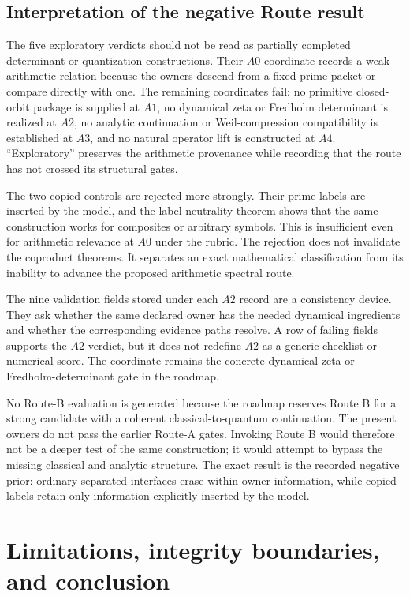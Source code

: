 \documentclass[11pt]{article}
\theoremstyle{definition}
\begin{document}
\subsection{Interpretation of the negative Route result}

The five exploratory verdicts should not be read as partially completed determinant or quantization constructions.  Their $A0$ coordinate records a weak arithmetic relation because the owners descend from a fixed prime packet or compare directly with one.  The remaining coordinates fail: no primitive closed-orbit package is supplied at $A1$, no dynamical zeta or Fredholm determinant is realized at $A2$, no analytic continuation or Weil-compression compatibility is established at $A3$, and no natural operator lift is constructed at $A4$.  ``Exploratory'' preserves the arithmetic provenance while recording that the route has not crossed its structural gates.

The two copied controls are rejected more strongly.  Their prime labels are inserted by the model, and the label-neutrality theorem shows that the same construction works for composites or arbitrary symbols.  This is insufficient even for arithmetic relevance at $A0$ under the rubric.  The rejection does not invalidate the coproduct theorems.  It separates an exact mathematical classification from its inability to advance the proposed arithmetic spectral route.

The nine validation fields stored under each $A2$ record are a consistency device.  They ask whether the same declared owner has the needed dynamical ingredients and whether the corresponding evidence paths resolve.  A row of failing fields supports the $A2$ verdict, but it does not redefine $A2$ as a generic checklist or numerical score.  The coordinate remains the concrete dynamical-zeta or Fredholm-determinant gate in the roadmap.

No Route-B evaluation is generated because the roadmap reserves Route B for a strong candidate with a coherent classical-to-quantum continuation.  The present owners do not pass the earlier Route-A gates.  Invoking Route B would therefore not be a deeper test of the same construction; it would attempt to bypass the missing classical and analytic structure.  The exact result is the recorded negative prior: ordinary separated interfaces erase within-owner information, while copied labels retain only information explicitly inserted by the model.

\section{Limitations, integrity boundaries, and conclusion}
\label{sec:limits}
\end{document}
